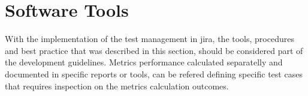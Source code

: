 \section{Software Tools}
\label{sect:tools}

With the implementation of the test management in jira, the tools, procedures and best practice that was described in this section, should be considered part of the development guidelines.
Metrics performance calculated separatelly and documented in specific reports or tools, can be refered defining specific test cases that requires inspection on the metrics calculation outcomes.

